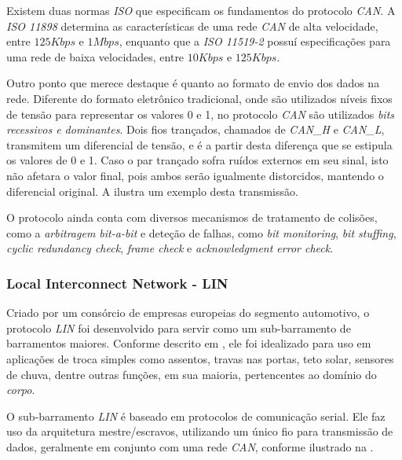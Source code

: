 Existem duas normas \emph{ISO} que especificam os fundamentos do protocolo \emph{CAN}. A \emph{ISO 11898} determina as características de uma rede \emph{CAN} de alta velocidade, entre $125Kbps$ e $1Mbps$, enquanto que a \emph{ISO 11519-2} possuí especificações para uma rede de baixa velocidades, entre $10Kbps$ e $125Kbps$.

Outro ponto que merece destaque é quanto ao formato de envio dos dados na rede. Diferente do formato eletrônico tradicional, onde são utilizados níveis fixos de tensão para representar os valores 0 e 1, no protocolo \emph{CAN} são utilizados \emph{bits recessivos e dominantes}. Dois fios trançados, chamados de \emph{CAN\_H} e \emph{CAN\_L}, transmitem um diferencial de tensão, e é a partir desta diferença que se estipula os valores de 0 e 1. Caso o par trançado sofra ruídos externos em seu sinal, isto não afetara o valor final, pois ambos serão igualmente distorcidos, mantendo o diferencial original. A  ilustra um exemplo desta transmissão.


O protocolo ainda conta com diversos mecanismos de tratamento de colisões, como a \emph{arbitragem bit-a-bit} e deteção de falhas, como \emph{bit monitoring}, \emph{bit stuffing}, \emph{cyclic redundancy check}, \emph{frame check} e \emph{acknowledgment error check}.

\subsubsection{Local Interconnect Network - LIN}
\label{cap:rede_lin}

Criado por um consórcio de empresas europeias do segmento automotivo, o protocolo \emph{LIN} foi desenvolvido para servir como um sub-barramento de barramentos maiores. Conforme descrito em , ele foi idealizado para uso em aplicações de troca simples como assentos, travas nas portas, teto solar, sensores de chuva, dentre outras funções, em sua maioria, pertencentes ao domínio do \emph{corpo}.

O sub-barramento \emph{LIN} é baseado em protocolos de comunicação serial. Ele faz uso da arquitetura mestre/escravos, utilizando um único fio para transmissão de dados, geralmente em conjunto com uma rede \emph{CAN}, conforme ilustrado na .



